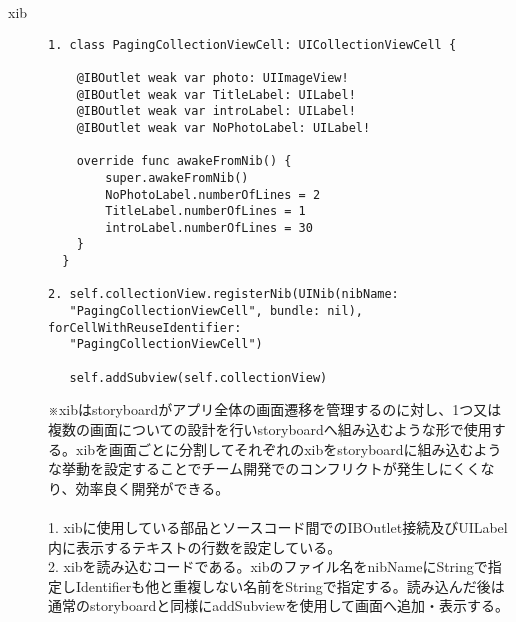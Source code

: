 \begin{description}
\item[xib]\mbox{} 
\begin{lstlisting}[basicstyle=\ttfamily\footnotesize, frame=single]
1. class PagingCollectionViewCell: UICollectionViewCell {
    
    @IBOutlet weak var photo: UIImageView!
    @IBOutlet weak var TitleLabel: UILabel!
    @IBOutlet weak var introLabel: UILabel!
    @IBOutlet weak var NoPhotoLabel: UILabel!
    
    override func awakeFromNib() {
        super.awakeFromNib()
        NoPhotoLabel.numberOfLines = 2
        TitleLabel.numberOfLines = 1
        introLabel.numberOfLines = 30
    }
  }
  
2. self.collectionView.registerNib(UINib(nibName: 
   "PagingCollectionViewCell", bundle: nil), forCellWithReuseIdentifier: 
   "PagingCollectionViewCell")
   
   self.addSubview(self.collectionView)
\end{lstlisting}
※xibはstoryboardがアプリ全体の画面遷移を管理するのに対し、1つ又は複数の画面についての設計を行いstoryboardへ組み込むような形で使用する。xibを画面ごとに分割してそれぞれのxibをstoryboardに組み込むような挙動を設定することでチーム開発でのコンフリクトが発生しにくくなり、効率良く開発ができる。 \\ \\
1. xibに使用している部品とソースコード間でのIBOutlet接続及びUILabel内に表示するテキストの行数を設定している。 \\
2. xibを読み込むコードである。xibのファイル名をnibNameにStringで指定しIdentifierも他と重複しない名前をStringで指定する。読み込んだ後は通常のstoryboardと同様にaddSubviewを使用して画面へ追加・表示する。 \\

\end{description}
